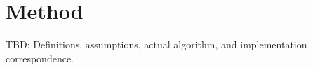 \section{Method}
TBD: Definitions, assumptions, actual algorithm, and implementation correspondence.
